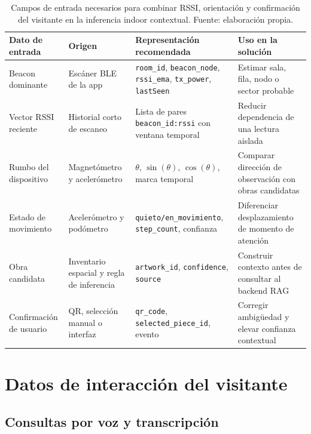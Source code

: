 \begin{table}[h!]
    \centering
    \footnotesize
    \setlength{\tabcolsep}{4pt}
    \begin{tabular}{>{\raggedright\arraybackslash}p{3.1cm} >{\raggedright\arraybackslash}p{3.2cm} >{\raggedright\arraybackslash}p{4.4cm} >{\raggedright\arraybackslash}p{4.0cm}}
        \hline
        \textbf{Dato de entrada} & \textbf{Origen} & \textbf{Representaci\'on recomendada} & \textbf{Uso en la soluci\'on} \\
        \hline
        Beacon dominante & Esc\'aner BLE de la app & \texttt{room\_id}, \texttt{beacon\_node}, \texttt{rssi\_ema}, \texttt{tx\_power}, \texttt{lastSeen} & Estimar sala, fila, nodo o sector probable \\
        Vector RSSI reciente & Historial corto de escaneo & Lista de pares \texttt{beacon\_id:rssi} con ventana temporal & Reducir dependencia de una lectura aislada \\
        Rumbo del dispositivo & Magnet\'ometro y aceler\'ometro & \(\theta\), \(\sin(\theta)\), \(\cos(\theta)\), marca temporal & Comparar direcci\'on de observaci\'on con obras candidatas \\
        Estado de movimiento & Aceler\'ometro y pod\'ometro & \texttt{quieto/en\_movimiento}, \texttt{step\_count}, confianza & Diferenciar desplazamiento de momento de atenci\'on \\
        Obra candidata & Inventario espacial y regla de inferencia & \texttt{artwork\_id}, \texttt{confidence}, \texttt{source} & Construir contexto antes de consultar al backend RAG \\
        Confirmaci\'on de usuario & QR, selecci\'on manual o interfaz & \texttt{qr\_code}, \texttt{selected\_piece\_id}, evento & Corregir ambig\"uedad y elevar confianza contextual \\
        \hline
    \end{tabular}
    \caption[Campos de entrada para inferencia indoor contextual]{Campos de entrada necesarios para combinar RSSI, orientaci\'on y confirmaci\'on del visitante en la inferencia indoor contextual. Fuente: elaboraci\'on propia.}
    \label{tab:campos-inferencia-indoor}
\end{table}

\section{Datos de interacción del visitante}

\subsection{Consultas por voz y transcripción}

